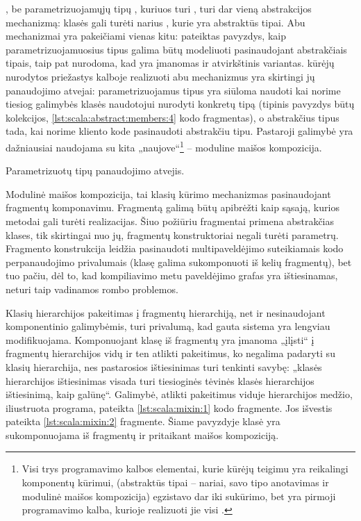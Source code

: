 , be parametrizuojamųjų tipų , kuriuos
turi , turi dar vieną abstrakcijos mechanizmą:
 klasės gali turėti narius , kurie
yra abstraktūs tipai. Abu mechanizmai yra pakeičiami vienas kitu:
\cite[10]{scala-overview} pateiktas pavyzdys, kaip parametrizuojamuosius
tipus galima būtų modeliuoti pasinaudojant abstrakčiais tipais, taip
pat nurodoma, kad yra įmanomas ir atvirkštinis variantas.
 kūrėjų \cite[11]{scala-overview} nurodytos
priežastys kalboje realizuoti abu mechanizmus yra skirtingi jų
panaudojimo atvejai: parametrizuojamus tipus yra siūloma naudoti kai
norime tiesiog galimybės klasės naudotojui nurodyti konkretų tipą
(tipinis pavyzdys būtų kolekcijos, \ref{lst:scala:abstract:members:4}
kodo fragmentas), o abstrakčius tipus tada, kai norime kliento kode
pasinaudoti abstrakčiu tipu. Pastaroji galimybė yra dažniausiai
naudojama su kita  „naujove“\footnote{
Visi trys programavimo kalbos elementai, kurie 
kūrėjų teigimu yra reikalingi komponentų kūrimui, (abstraktūs
tipai – nariai, savo tipo anotavimas ir modulinė maišos kompozicija)
egzistavo dar iki  sukūrimo, bet 
yra pirmoji programavimo kalba, kurioje realizuoti jie visi
\cite[2]{scalable-component-abstractions}.} – moduline maišos
kompozicija.

\begin{scalainterpreterlisting}
  \caption{Parametrizuotų tipų panaudojimo atvejis.}
  \label{lst:scala:abstract:members:4}
\end{scalainterpreterlisting}

Modulinė maišos kompozicija, tai klasių kūrimo mechanizmas
pasinaudojant fragmentų  komponavimu. Fragmentą galimą
būtų apibrėžti kaip sąsają, kurios metodai gali turėti
realizacijas. Šiuo požiūriu fragmentai primena abstrakčias klases,
tik skirtingai nuo jų, fragmentų konstruktoriai negali turėti
parametrų. Fragmento konstrukcija leidžia pasinaudoti
multipaveldėjimo suteikiamais kodo perpanaudojimo privalumais
(klasę galima sukomponuoti iš kelių fragmentų), bet tuo pačiu, dėl
to, kad kompiliavimo metu paveldėjimo grafas yra ištiesinamas, neturi
taip vadinamos rombo problemos.

Klasių hierarchijos pakeitimas į fragmentų hierarchiją, net ir
nesinaudojant komponentinio galimybėmis, turi privalumą, kad
gauta sistema yra lengviau modifikuojama. Komponuojant klasę iš
fragmentų yra įmanoma „įlįsti“ į fragmentų hierarchijos vidų
ir ten atlikti pakeitimus, ko negalima padaryti su klasių hierarchija,
nes pastarosios ištiesinimas turi tenkinti savybę: „klasės hierarchijos
ištiesinimas visada turi tiesioginės tėvinės klasės hierarchijos
ištiesinimą, kaip galūnę“\cite[57p.]{scala-reference}. Galimybė,
atlikti pakeitimus viduje hierarchijos medžio, iliustruota programa,
pateikta \ref{lst:scala:mixin:1} kodo fragmente. Jos išvestis pateikta
\ref{lst:scala:mixin:2} fragmente. Šiame pavyzdyje klasė 
yra sukomponuojama iš fragmentų  ir  pritaikant
maišos kompoziciją.

